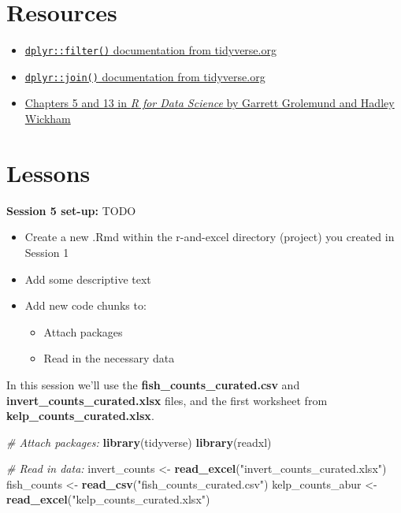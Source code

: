 \documentclass[]{book}
\newenvironment{Shaded}{\begin{snugshade}}{\end{snugshade}}
\newcommand{\CommentTok}[1]{\textcolor[rgb]{0.56,0.35,0.01}{\textit{#1}}}
\newcommand{\KeywordTok}[1]{\textcolor[rgb]{0.13,0.29,0.53}{\textbf{#1}}}
\newcommand{\NormalTok}[1]{#1}
\newcommand{\StringTok}[1]{\textcolor[rgb]{0.31,0.60,0.02}{#1}}
\providecommand{\tightlist}{%
  \setlength{\itemsep}{0pt}\setlength{\parskip}{0pt}}
\begin{document}
\hypertarget{resources-4}{%
\section{Resources}\label{resources-4}}

\begin{itemize}
\tightlist
\item
  \href{https://dplyr.tidyverse.org/reference/filter.html}{\texttt{dplyr::filter()} documentation from tidyverse.org}
\item
  \href{https://dplyr.tidyverse.org/reference/join.html}{\texttt{dplyr::join()} documentation from tidyverse.org}
\item
  \href{https://r4ds.had.co.nz/}{Chapters 5 and 13 in \emph{R for Data Science} by Garrett Grolemund and Hadley Wickham}
\end{itemize}

\hypertarget{lessons}{%
\section{Lessons}\label{lessons}}

\textbf{Session 5 set-up:} TODO

\begin{itemize}
\tightlist
\item
  Create a new .Rmd within the r-and-excel directory (project) you created in Session 1
\item
  Add some descriptive text
\item
  Add new code chunks to:

  \begin{itemize}
  \tightlist
  \item
    Attach packages
  \item
    Read in the necessary data
  \end{itemize}
\end{itemize}

In this session we'll use the \textbf{fish\_counts\_curated.csv} and \textbf{invert\_counts\_curated.xlsx} files, and the first worksheet from \textbf{kelp\_counts\_curated.xlsx}.

\begin{Shaded}
\begin{Highlighting}[]
\CommentTok{# Attach packages:}
\KeywordTok{library}\NormalTok{(tidyverse)}
\KeywordTok{library}\NormalTok{(readxl)}

\CommentTok{# Read in data: }
\NormalTok{invert_counts <-}\StringTok{ }\KeywordTok{read_excel}\NormalTok{(}\StringTok{"invert_counts_curated.xlsx"}\NormalTok{)}
\NormalTok{fish_counts <-}\StringTok{ }\KeywordTok{read_csv}\NormalTok{(}\StringTok{"fish_counts_curated.csv"}\NormalTok{)}
\NormalTok{kelp_counts_abur <-}\StringTok{ }\KeywordTok{read_excel}\NormalTok{(}\StringTok{"kelp_counts_curated.xlsx"}\NormalTok{)}
\end{Highlighting}
\end{Shaded}
\end{document}
